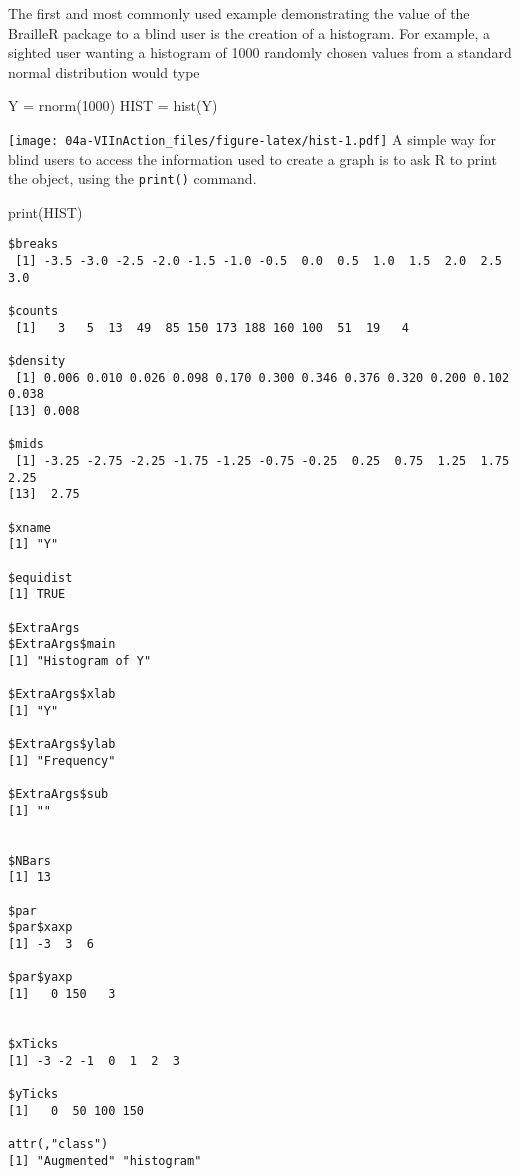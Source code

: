 \documentclass[
]{book}
\newenvironment{Shaded}{\begin{snugshade}}{\end{snugshade}}
\newcommand{\DecValTok}[1]{\textcolor[rgb]{0.00,0.00,0.81}{#1}}
\newcommand{\FunctionTok}[1]{\textcolor[rgb]{0.00,0.00,0.00}{#1}}
\newcommand{\NormalTok}[1]{#1}
\newcommand{\OtherTok}[1]{\textcolor[rgb]{0.56,0.35,0.01}{#1}}
\begin{document}
The first and most commonly used example demonstrating the value of the BrailleR package to a blind user is the creation of a histogram. For example, a sighted user wanting a histogram of 1000 randomly chosen values from a standard normal distribution would type

\begin{Shaded}
\begin{Highlighting}[]
\NormalTok{Y }\OtherTok{=} \FunctionTok{rnorm}\NormalTok{(}\DecValTok{1000}\NormalTok{)}
\NormalTok{HIST }\OtherTok{=} \FunctionTok{hist}\NormalTok{(Y)}
\end{Highlighting}
\end{Shaded}

\texttt{[image: 04a-VIInAction\_files/figure-latex/hist-1.pdf]}
A simple way for blind users to access the information used to create a graph is to ask R to print the object, using the \texttt{print()} command.

\begin{Shaded}
\begin{Highlighting}[]
\FunctionTok{print}\NormalTok{(HIST)}
\end{Highlighting}
\end{Shaded}

\begin{verbatim}
$breaks
 [1] -3.5 -3.0 -2.5 -2.0 -1.5 -1.0 -0.5  0.0  0.5  1.0  1.5  2.0  2.5  3.0

$counts
 [1]   3   5  13  49  85 150 173 188 160 100  51  19   4

$density
 [1] 0.006 0.010 0.026 0.098 0.170 0.300 0.346 0.376 0.320 0.200 0.102 0.038
[13] 0.008

$mids
 [1] -3.25 -2.75 -2.25 -1.75 -1.25 -0.75 -0.25  0.25  0.75  1.25  1.75  2.25
[13]  2.75

$xname
[1] "Y"

$equidist
[1] TRUE

$ExtraArgs
$ExtraArgs$main
[1] "Histogram of Y"

$ExtraArgs$xlab
[1] "Y"

$ExtraArgs$ylab
[1] "Frequency"

$ExtraArgs$sub
[1] ""


$NBars
[1] 13

$par
$par$xaxp
[1] -3  3  6

$par$yaxp
[1]   0 150   3


$xTicks
[1] -3 -2 -1  0  1  2  3

$yTicks
[1]   0  50 100 150

attr(,"class")
[1] "Augmented" "histogram"
\end{verbatim}
\end{document}
